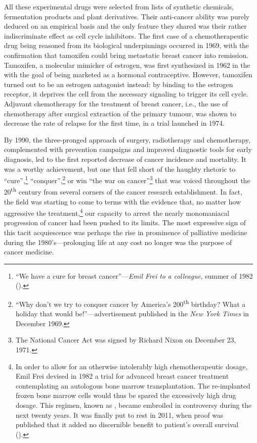 All these experimental drugs were selected from lists of synthetic chemicals,
fermentation products and plant derivatives.  Their anti-cancer ability was
purely deduced on an empirical basis and the only feature they shared was their
rather indiscriminate effect as cell cycle inhibitors.  The first case of a
chemotherapeutic drug being reasoned from its biological underpinnings occurred
in 1969, with the confirmation that tamoxifen could bring metastatic breast
cancer into remission.\cite{cole_new_1971} Tamoxifen, a molecular mimicker of
estrogen, was first synthesized in 1962 in the  with the goal of
being marketed as a hormonal contraceptive.  However, tamoxifen turned out to be
an estrogen antagonist instead: by binding to the estrogen receptor, it deprives
the cell from the necessary signaling to trigger its cell
cycle.\cite{jordan_effects_1977} Adjuvant chemotherapy for the treatment of
breast cancer, i.e., the use of chemotherapy after surgical extraction of the
primary tumour, was shown to decrease the rate of relapse for the first time, in
a trial launched in 1974.\cite{bonadonna_combination_1976}

By 1990, the three-pronged approach of surgery, radiotherapy and chemotherapy,
complemented with prevention campaigns and improved diagnostic tools for early
diagnosis, led to the first reported decrease of cancer incidence and
mortality.\cite{devita_two_2012} It was a worthy achievement, but one that fell
short of the haughty rhetoric to ``cure'',\footnote{``We have a cure for breast
  cancer''---\emph{Emil Frei to a colleague}, summer of 1982
  (\citealp{mukherjee_emperor_2011}).} ``conquer'',\footnote{``Why don't we try
  to conquer cancer by America's 200\textsuperscript{th} birthday? What a
  holiday that would be!''---advertisement published in the \emph{New York
    Times} in December 1969.} or win ``the war on cancer''\footnote{The National
  Cancer Act was signed by Richard Nixon on December 23, 1971.} that was voiced
throughout the 20\textsuperscript{th} century from several corners of the cancer
research establishment.  In fact, the field was starting to come to terms with
the evidence that, no matter how aggressive the treatment,\footnote{In order to
  allow for an otherwise intolerably high chemotherapeutic dosage, Emil Frei
  devised in 1982 a trial for advanced breast cancer treatment contemplating an
  autologous bone marrow transplantation.  The re-implanted frozen bone marrow
  cells would thus be spared the excessively high drug dosage.  This regimen,
  known as , became embroiled in controversy during the next
  twenty years.  It was finally put to rest in 2011, when proof was published
  that it added no discernible benefit to patient's overall survival
  (\citealp{berry_high-dose_2011}).} our capacity to arrest the nearly
monomaniacal progression of cancer had been pushed to its limits.  The most
expressive sign of this tacit acquiescence was perhaps the rise in prominence of
palliative medicine during the 1980's---prolonging life at any cost no longer
was the purpose of cancer medicine.


